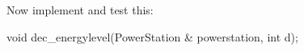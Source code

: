 Now implement and test this:
\begin{console}
void dec_energylevel(PowerStation & powerstation, int d);
\end{console}

